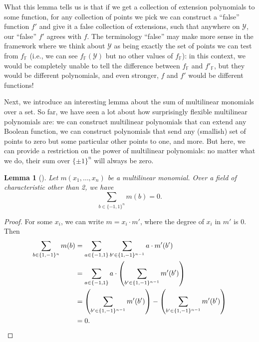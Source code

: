 \documentclass[english,12pt]{reedthesis}
\theoremstyle{plain}
\newtheorem{lemma}[lemma]{Lemma}
\theoremstyle{definition}
\theoremstyle{remark}
\begin{document}
What this lemma tells us is that if we get a collection of extension polynomials
to some function, for any collection of points we pick we can construct a
``false'' function $f'$ and give it a false collection of extensions, such that
anywhere on $\mathcal{Y}$, our ``false'' $f'$ agrees with $f$. The terminology ``false''
may make more sense in the framework where we think about $\mathcal{Y}$ as being exactly
the set of points we can test from $f_{\mathbb{F}}$ (i.e., we can see
$f_{\mathbb{F}}(\mathcal{Y})$ but no other values of $f_{\mathbb{F}}$): in this context,
we would be completely unable to tell the difference between $f_{\mathbb{F}}$
and $f'_{\mathbb{F}}$, but they would be different polynomials, and even
stronger, $f$ and $f'$ would be different functions!

Next, we introduce an interesting lemma about the sum of multilinear monomials
over a set. So far, we have seen a lot about how surprisingly flexible
multilinear polynomials are: we can construct multilinear polynomials that can
extend any Boolean function, we can construct polynomials that send any
(smallish) set of points to zero but some particular other points to one, and
more. But here, we can provide a restriction on the power of multilinear
polynomials: no matter what we do, their sum over $\{\pm 1\}^{n}$ will always be
zero.

\begin{lemma}[{\cite[Lemma 7]{JKRS09}}]\label{lem:monomial-sum}
  Let $m(x_{1}, \ldots, x_{n})$ be a multilinear monomial. Over a field of
  characteristic other than 2, we have
  \begin{equation}
    \sum_{b \in \{-1, 1\}^{n}}m(b) = 0.
  \end{equation}
\end{lemma}

\begin{proof}
  For some $x_{i}$, we can write $m = x_{i} \cdot m'$, where the degree of $x_{i}$
  in $m'$ is 0. Then
  \begin{align*}
    \sum_{b \in \{1, -1\}^{n}}m(b)
    &= \sum_{a \in \{-1, 1\}}\sum_{b' \in \{1, -1\}^{n-1}}a \cdot m'(b') \\
    &= \sum_{a \in \{-1, 1\}} a \cdot \mleft(\sum_{b' \in \{1, -1\}^{n-1}} m'(b')\mright) \\
    &= \mleft(\sum_{b' \in \{1, -1\}^{n-1}} m'(b')\mright) - \mleft(\sum_{b' \in \{1, -1\}^{n-1}} m'(b')\mright) \\
    &= 0.
  \end{align*}
\end{proof}
\end{document}
